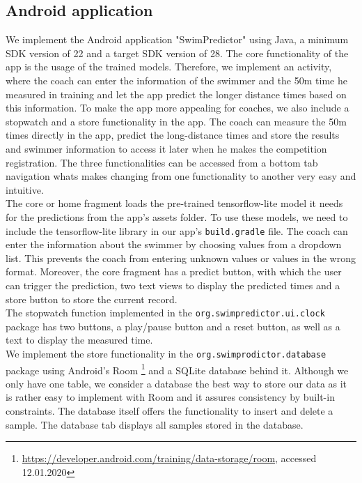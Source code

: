 \subsection{Android application}\label{sec:app_plans}
We implement the Android application "SwimPredictor" using Java, a minimum SDK version of 22 and a target SDK version of 28. The core functionality of the app is the usage of the trained models. Therefore, we implement an activity, where the coach can enter the information of the swimmer and the 50m time he measured in training and let the app predict the longer distance times based on this information. To make the app more appealing for coaches, we also include a stopwatch and a store functionality in the app. The coach can measure the 50m times directly in the app, predict the long-distance times and store the results and swimmer information to access it later when he makes the competition registration. The three functionalities can be accessed from a bottom tab navigation whats makes changing from one functionality to another very easy and intuitive.\\
The core or home fragment loads the pre-trained tensorflow-lite model it needs for the predictions from the app's assets folder. To use these models, we need to include the tensorflow-lite library in our app's \texttt{build.gradle} file. The coach can enter the information about the swimmer by choosing values from a dropdown list. This prevents the coach from entering unknown values or values in the wrong format. Moreover, the core fragment has a predict button, with which the user can trigger the prediction, two text views to display the predicted times and a store button to store the current record.\\
The stopwatch function implemented in the \texttt{org.swimpredictor.ui.clock} package has two buttons, a play/pause button and a reset button, as well as a text to display the measured time.\\
We implement the store functionality in the \texttt{org.swimprodictor.database} package using Android's Room \footnote{\url{https://developer.android.com/training/data-storage/room}, accessed 12.01.2020} and a SQLite database behind it. Although we only have one table, we consider a database the best way to store our data as it is rather easy to implement with Room and it assures consistency by built-in constraints. The database itself offers the functionality to insert and delete a sample. The database tab displays all samples stored in the database.
